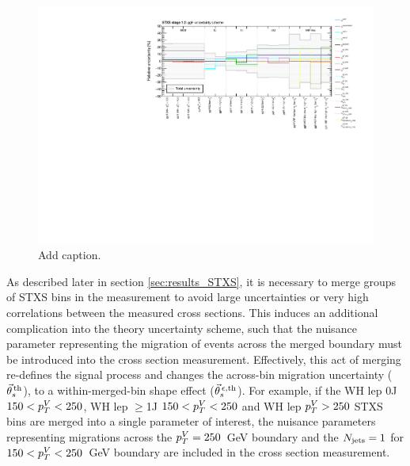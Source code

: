 \begin{figure}[htb]
  \centering
  \includegraphics[width=1\textwidth]{Figures/hgg_stats/ggH_NPScheme.pdf}
  \caption[STXS stage 1.2 ggH uncertainty scheme]
  {
    Add caption.
  }
  \label{fig:ggH_uncertainty_scheme}
\end{figure}

As described later in section \ref{sec:results_STXS}, it is necessary to merge groups of STXS bins in the measurement to avoid large uncertainties or very high correlations between the measured cross sections. This induces an additional complication into the theory uncertainty scheme, such that the nuisance parameter representing the migration of events across the merged boundary must be introduced into the cross section measurement. Effectively, this act of merging re-defines the signal process and changes the across-bin migration uncertainty ($\vec{\theta}^{\,\rm{th}}_{s}$), to a within-merged-bin shape effect ($\vec{\theta}^{\,\epsilon,{\rm{th}}}_{s}$). For example, if the WH lep 0J $150<p_T^V<250$, WH lep $\geq$1J $150<p_T^V<250$ and WH lep $p_T^V>250$ STXS bins are merged into a single parameter of interest, the nuisance parameters representing migrations across the $p_T^V=250$~GeV boundary and the $N_{\rm{jets}}=1$ for $150<p_T^V<250$~GeV boundary are included in the cross section measurement.

